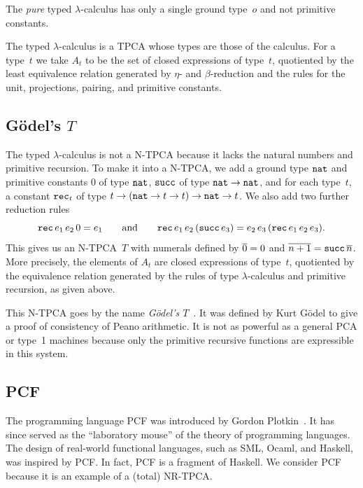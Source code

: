 The \emph{pure} typed $\lambda$-calculus has only a single ground
type~$o$ and not primitive constants.

The typed $\lambda$-calculus is a TPCA whose types are those of the
calculus. For a type~$t$ we take $A_t$ to be the set of closed
expressions of type~$t$, quotiented by the least equivalence relation
generated by $\eta$- and $\beta$-reduction and the rules for the unit,
projections, pairing, and primitive constants.


\subsection{G\"odel's $T$}

The typed $\lambda$-calculus is not a N-TPCA because it lacks the
natural numbers and primitive recursion. To make it into a N-TPCA, we
add a ground type $\mathtt{nat}$ and primitive constants $0$ of type
$\mathtt{nat}$, $\mathtt{succ}$ of type $\mathtt{nat} \to \mathtt{nat}$, and for each
type~$t$, a constant $\mathtt{rec}_t$ of type $t \to (\mathtt{nat} \to t
\to t) \to \mathtt{nat} \to t$. We also add two further reduction rules
%
\begin{equation*}
  \mathtt{rec} \, e_1 \, e_2 \, 0 = e_1
  \qquad\text{and}\qquad
  \mathtt{rec} \, e_1 \, e_2 \, (\mathtt{succ} \, e_3) =
  e_2 \, e_3 \, (\mathtt{rec} \, e_1 \, e_2 \, e_3).
\end{equation*}
%
This gives us an N-TPCA~$T$ with numerals defined by $\overline{0} = 0$
and $\overline{n+1} = \mathtt{succ} \, \overline{n}$. More precisely, the
elements of $A_t$ are closed expressions of type~$t$, quotiented by
the equivalence relation generated by the rules of type
$\lambda$-calculus and primitive recursion, as given above.

This N-TPCA goes by the name \emph{G\"odel's
  $T$}~\cite{GoedelK:ubeefs}. It was defined by Kurt G\"odel to give a
proof of consistency of Peano arithmetic. It is not as powerful as a
general PCA or type~1 machines because only the primitive recursive
functions are expressible in this system.

\subsection{PCF}
\label{sec:pcf}

The programming language PCF was introduced by Gordon
Plotkin~\cite{plotkin77:_lcf_consid_as_progr_languag}. It has since
served as the ``laboratory mouse'' of the theory of programming
languages. The design of real-world functional languages, such as SML,
Ocaml, and Haskell, was inspired by PCF. In fact, PCF is a fragment of
Haskell. We consider PCF because it is an example of a (total)
NR-TPCA.

